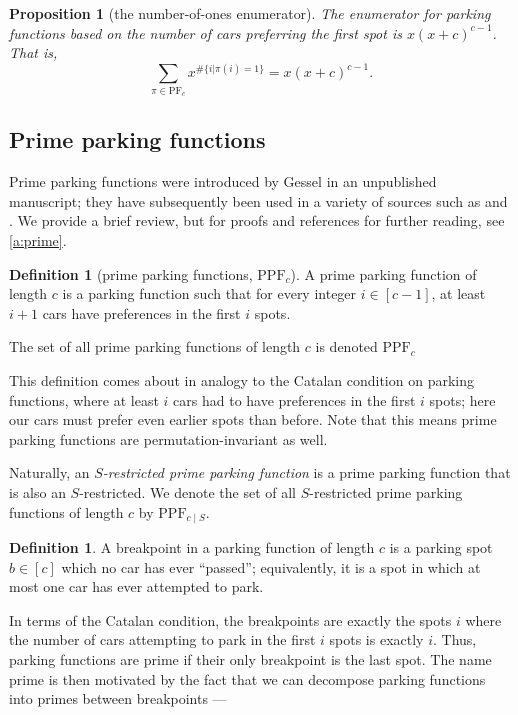 \documentclass[12 pt]{amsart}
\newtheorem{proposition}[theorem]{Proposition}
\theoremstyle{definition} %
\newtheorem{definition}[theorem]{Definition}
\theoremstyle{remark} %
\begin{document}
\begin{proposition}[the number-of-ones enumerator]
\label{prop:1s-enumerator}
    The enumerator for parking functions based on the number of cars preferring the first spot is $x(x+c)^{c-1}$. That is, 
\[
	\sum_{\pi \in \mathrm{PF}_c} x^{\#\{i|\pi(i)=1\}} = x (x + c)^{c - 1}.
\]
\end{proposition}

\subsection{Prime parking functions}

Prime parking functions were introduced by Gessel in an unpublished manuscript; they have subsequently been used in a variety of sources such as \cite{athanasiadis-linusson-1999} and \cite{meyles-2023}. We provide a brief review, but for proofs and references for further reading, see \cref{a:prime}.

\begin{definition}[prime parking functions, $\mathrm{PPF}_{c}$]
    A prime parking function of length $c$ is a parking function such that for every integer $i\in[c-1]$, at least $i+1$ cars have preferences in the first $i$ spots.

    The set of all prime parking functions of length $c$ is denoted $\mathrm{PPF}_{c}$
\end{definition}

This definition comes about in analogy to the Catalan condition on parking functions, where at least $i$ cars had to have preferences in the first $i$ spots; here our cars must prefer even earlier spots than before. Note that this means prime parking functions are permutation-invariant as well.

Naturally, an \emph{$S$-restricted prime parking function} is a prime parking function that is also an $S$-restricted. We denote the set of all $S$-restricted prime parking functions of length $c$ by $\mathrm{PPF}_{c \mid S}$.

\begin{definition}
    A breakpoint in a parking function of length $c$ is a parking spot $b\in[c]$ which no car has ever ``passed''; equivalently, it is a spot in which at most one car has ever attempted to park.
\end{definition}

In terms of the Catalan condition, the breakpoints are exactly the spots $i$ where the number of cars attempting to park in the first $i$ spots is exactly $i$. Thus, parking functions are prime if their only breakpoint is the last spot. The name prime is then motivated by the fact that we can decompose parking functions into primes between breakpoints ---
\end{document}
